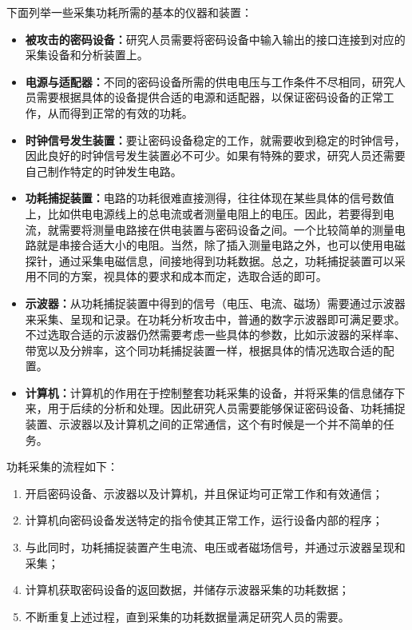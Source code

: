 下面列举一些采集功耗所需的基本的仪器和装置：

\begin{itemize}
\item \textbf{被攻击的密码设备：}研究人员需要将密码设备中输入输出的接口连接到对应的采集设备和分析装置上。
\item \textbf{电源与适配器：}不同的密码设备所需的供电电压与工作条件不尽相同，研究人员需要根据具体的设备提供合适的电源和适配器，以保证密码设备的正常工作，从而得到正常的有效的功耗。
\item \textbf{时钟信号发生装置：}要让密码设备稳定的工作，就需要收到稳定的时钟信号，因此良好的时钟信号发生装置必不可少。如果有特殊的要求，研究人员还需要自己制作特定的时钟发生电路。
\item \textbf{功耗捕捉装置：}电路的功耗很难直接测得，往往体现在某些具体的信号数值上，比如供电电源线上的总电流或者测量电阻上的电压。因此，若要得到电流，就需要将测量电路接在供电装置与密码设备之间。一个比较简单的测量电路就是串接合适大小的电阻。当然，除了插入测量电路之外，也可以使用电磁探针，通过采集电磁信息，间接地得到功耗数据。总之，功耗捕捉装置可以采用不同的方案，视具体的要求和成本而定，选取合适的即可。
\item \textbf{示波器：}从功耗捕捉装置中得到的信号（电压、电流、磁场）需要通过示波器来采集、呈现和记录。在功耗分析攻击中，普通的数字示波器即可满足要求。不过选取合适的示波器仍然需要考虑一些具体的参数，比如示波器的采样率、带宽以及分辨率，这个同功耗捕捉装置一样，根据具体的情况选取合适的配置。
\item \textbf{计算机：}计算机的作用在于控制整套功耗采集的设备，并将采集的信息储存下来，用于后续的分析和处理。因此研究人员需要能够保证密码设备、功耗捕捉装置、示波器以及计算机之间的正常通信，这个有时候是一个并不简单的任务。

\end{itemize}

\vspace*{\baselineskip}

功耗采集的流程如下：

\begin{enumerate}
\item 开启密码设备、示波器以及计算机，并且保证均可正常工作和有效通信；
\item 计算机向密码设备发送特定的指令使其正常工作，运行设备内部的程序；
\item 与此同时，功耗捕捉装置产生电流、电压或者磁场信号，并通过示波器呈现和采集；
\item 计算机获取密码设备的返回数据，并储存示波器采集的功耗数据；
\item 不断重复上述过程，直到采集的功耗数据量满足研究人员的需要。

\end{enumerate}


